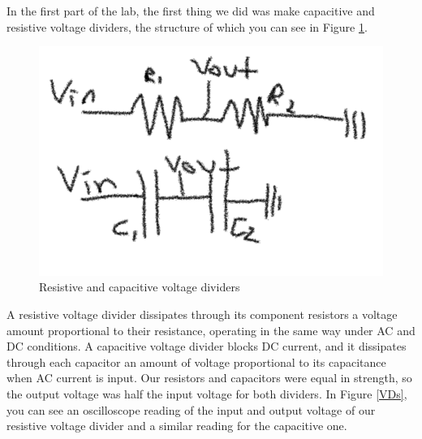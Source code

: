 \documentclass[11pt]{article}
\begin{document}
In the first part of the lab, the first thing we did was make capacitive and resistive voltage dividers, the
structure of which you can see in Figure \ref{RC_div}.
\begin{figure}
\centering
\includegraphics[scale=0.35]{dividers}
\caption{Resistive and capacitive voltage dividers \label{RC_div}}
\end{figure}
A resistive voltage divider dissipates through its component resistors a voltage amount proportional to
their resistance, operating in the same way under AC and DC conditions. A capacitive voltage divider 
blocks DC current, and it dissipates through each capacitor an amount of voltage proportional to its
capacitance when AC current is input. Our resistors and capacitors were equal in strength, so the output 
voltage was half the input voltage for both dividers. In Figure \ref{VDs}, you can see an oscilloscope reading 
of the input and output voltage of our resistive voltage divider and a similar reading
for the capacitive one. 
\end{document}
